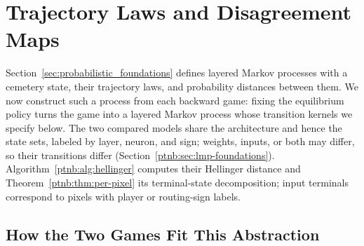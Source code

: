 \section{Trajectory Laws and Disagreement Maps}\label{sec:trajectory_disagreement}

Section~\ref{sec:probabilistic_foundations} defines layered Markov processes with a cemetery state, their trajectory laws, and probability distances between them. We now construct such a process from each backward game: fixing the equilibrium policy turns the game into a layered Markov process whose transition kernels we specify below. The two compared models share the architecture and hence the state sets, labeled by layer, neuron, and sign; weights, inputs, or both may differ, so their transitions differ (Section~\ref{ptnb:sec:lmp-foundations}). Algorithm~\ref{ptnb:alg:hellinger} computes their Hellinger distance and Theorem~\ref{ptnb:thm:per-pixel} its terminal-state decomposition; input terminals correspond to pixels with player or routing-sign labels.

\subsection{How the Two Games Fit This Abstraction}\label{ptnb:sec:games-fit}

